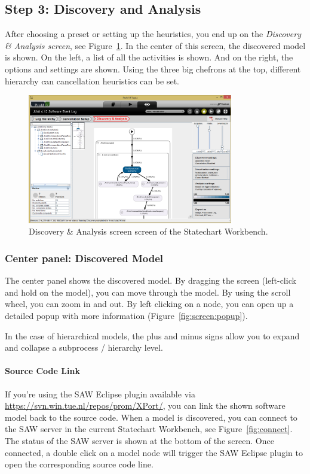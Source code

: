 \documentclass{article}
\begin{document}
\subsection{Step 3: Discovery and Analysis}
\label{sec:discovery}
After choosing a preset or setting up the heuristics, you end up on the \emph{Discovery \& Analysis screen}, see Figure~\ref{fig:discovery}.
In the center of this screen, the discovered model is shown.
On the left, a list of all the activities is shown.
And on the right, the options and settings are shown.
Using the three big chefrons at the top, different hierarchy can cancellation heuristics can be set.

\begin{figure}[h!]
\centering
\includegraphics[width=0.8\textwidth]{gfx/discovery.png}
\caption{Discovery \& Analysis screen screen of the Statechart Workbench.}
\label{fig:discovery}
\end{figure}

\subsubsection{Center panel: Discovered Model}
The center panel shows the discovered model.
By dragging the screen (left-click and hold on the model), you can move through the model.
By using the scroll wheel, you can zoom in and out.
By left clicking on a node, you can open up a detailed popup with more information (Figure~\ref{fig:screen:popup}).

In the case of hierarchical models, the plus and minus signs allow you to expand and collapse a subprocess / hierarchy level.

\paragraph{Source Code Link}
If you're using the SAW Eclipse plugin available via
\url{https://svn.win.tue.nl/repos/prom/XPort/},
you can link the shown software model back to the source code.
When a model is discovered, you can connect to the SAW server in the current Statechart Workbench,
see Figure~\ref{fig:connect}.
The status of the SAW server is shown at the bottom of the screen.
Once connected, a double click on a model node will trigger the SAW Eclipse plugin
to open the corresponding source code line.
\end{document}
